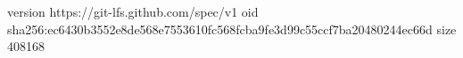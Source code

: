 version https://git-lfs.github.com/spec/v1
oid sha256:ec6430b3552e8de568e7553610fc568fcba9fe3d99c55ccf7ba20480244ec66d
size 408168
